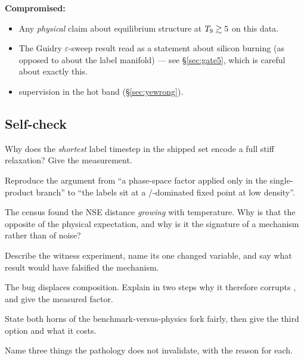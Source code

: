 \textbf{Compromised:}

\begin{itemize}
\item Any \emph{physical} claim about equilibrium structure at $T_{9} \gtrsim 5$
  on this data.
\item The Guidry $\varepsilon$-sweep result read as a statement about silicon
  burning (as opposed to about the label manifold) --- see \S\ref{sec:gate5},
  which is careful about exactly this.
\item \Ye{} supervision in the hot band (\S\ref{sec:yewrong}).
\end{itemize}

\subsection{Self-check}
\label{sec:selfcheck-pathology}

\begin{selfcheck}
\item Why does the \emph{shortest} label timestep in the shipped set encode a
  full stiff relaxation? Give the measurement.
\item Reproduce the argument from ``a phase-space factor applied only in the
  single-product branch'' to ``the labels sit at a
  /-dominated fixed point at low density''.
\item The census found the NSE distance \emph{growing} with temperature. Why is
  that the opposite of the physical expectation, and why is it the signature
  of a mechanism rather than of noise?
\item Describe the witness experiment, name its one changed variable, and say
  what result would have falsified the mechanism.
\item The bug displaces composition. Explain in two steps why it therefore
  corrupts \Ye{}, and give the measured factor.
\item State both horns of the benchmark-versus-physics fork fairly, then give
  the third option and what it costs.
\item Name three things the pathology does not invalidate, with the reason for
  each.
\end{selfcheck}
